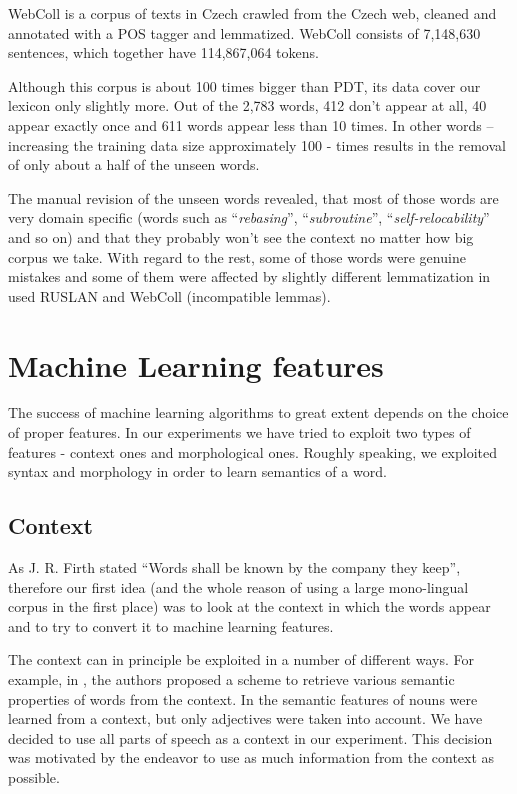 \documentclass[letterpaper]{article}
\begin{document}
WebColl\cite{webcoll} is a corpus of texts in Czech crawled from the Czech web, cleaned and annotated  with a POS tagger and lemmatized.
WebColl consists of 7,148,630 sentences, which together have 114,867,064 tokens. 

Although this corpus is about 100 times bigger than PDT, its data cover our lexicon only slightly more. Out of the 2,783 words, 412 don't appear at all, 
40 appear exactly once and 611 words appear less than 10 times. In other words -- increasing the training data size approximately 100 - times results in the removal of only about a half of the unseen words.

The manual revision of the unseen words revealed, that most of those words are very domain specific 
(words such as ``\emph{rebasing}'', ``\emph{subroutine}'', ``\emph{self-relocability}'' and so on) 
and that they probably won't see the context no matter how big corpus we take. With regard to the rest, some of those words were genuine mistakes and some of them were affected by slightly different lemmatization in used RUSLAN and WebColl (incompatible lemmas).


\section{Machine Learning features}
The success of machine learning algorithms to great extent depends on the 
choice of proper 
features.
In our experiments we have tried to exploit two types of features 
- context ones and morphological ones. 
Roughly speaking, we exploited syntax and morphology in order to learn semantics of a word.  

\subsection{Context}
As J. R. Firth stated ``Words shall be known by the company they keep'',
therefore our first idea (and the whole reason of using a large mono-lingual corpus in the first place) 
was to look at the context in which the words appear and to try to convert it to machine learning features.

The context can in principle be exploited in a number of different ways. For example,
in \cite{baroni:2009}, the authors proposed a scheme to retrieve
various semantic properties of words from the context.
In \cite{biemann05} the semantic features of nouns were learned
from a context, but only adjectives were taken into account.
We have decided to use all parts of speech as a context in our experiment. This decision was motivated by the endeavor to use as much information from the context as possible. 
\end{document}

